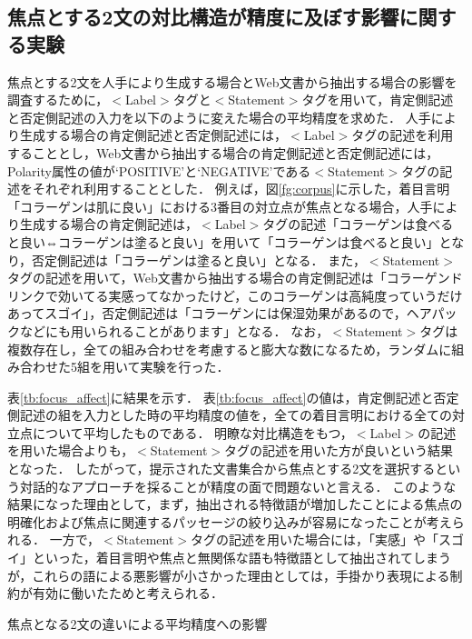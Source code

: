 \documentclass[japanese]{jnlp_1.4}
\begin{document}
\subsection{焦点とする2文の対比構造が精度に及ぼす影響に関する実験}

焦点とする2文を人手により生成する場合とWeb文書から抽出する場合の影響を調査するために，{\sf$<$Label$>$}タグと{\sf$<$Statement$>$}タグを用いて，肯定側記述と否定側記述の入力を以下のように変えた場合の平均精度を求めた．
人手により生成する場合の肯定側記述と否定側記述には，{\sf$<$Label$>$}タグの記述を利用することとし，Web文書から抽出する場合の肯定側記述と否定側記述には，{\sf Polarity}属性の値が{\sf `POSITIVE'}と{\sf `NEGATIVE'}である{\sf$<$Statement$>$}タグの記述をそれぞれ利用することとした．
例えば，図\ref{fg:corpus}に示した，着目言明「コラーゲンは肌に良い」における3番目の対立点が焦点となる場合，人手により生成する場合の肯定側記述は，{\sf$<$Label$>$}タグの記述「コラーゲンは食べると良い⇔コラーゲンは塗ると良い」を用いて「コラーゲンは食べると良い」となり，否定側記述は「コラーゲンは塗ると良い」となる．
また，{\sf$<$Statement$>$}タグの記述を用いて，Web文書から抽出する場合の肯定側記述は「コラーゲンドリンクで効いてる実感ってなかったけど，このコラーゲンは高純度っていうだけあってスゴイ」，否定側記述は「コラーゲンには保湿効果があるので，ヘアパックなどにも用いられることがあります」となる．
なお，{\sf$<$Statement$>$}タグは複数存在し，全ての組み合わせを考慮すると膨大な数になるため，ランダムに組み合わせた5組を用いて実験を行った．

表\ref{tb:focus_affect}に結果を示す．
表\ref{tb:focus_affect}の値は，肯定側記述と否定側記述の組を入力とした時の平均精度の値を，全ての着目言明における全ての対立点について平均したものである．
明瞭な対比構造をもつ，{\sf$<$Label$>$}の記述を用いた場合よりも，{\sf$<$Statement$>$}タグの記述を用いた方が良いという結果となった．
したがって，提示された文書集合から焦点とする2文を選択するという対話的なアプローチを採ることが精度の面で問題ないと言える．
このような結果になった理由として，まず，抽出される特徴語が増加したことによる焦点の明確化および焦点に関連するパッセージの絞り込みが容易になったことが考えられる．
一方で，{\sf$<$Statement$>$}タグの記述を用いた場合には，「実感」や「スゴイ」といった，着目言明や焦点と無関係な語も特徴語として抽出されてしまうが，これらの語による悪影響が小さかった理由としては，手掛かり表現による制約が有効に働いたためと考えられる．

\begin{table}[t]
 \caption{焦点となる2文の違いによる平均精度への影響}
 \label{tb:focus_affect}

\end{table}
\end{document}

